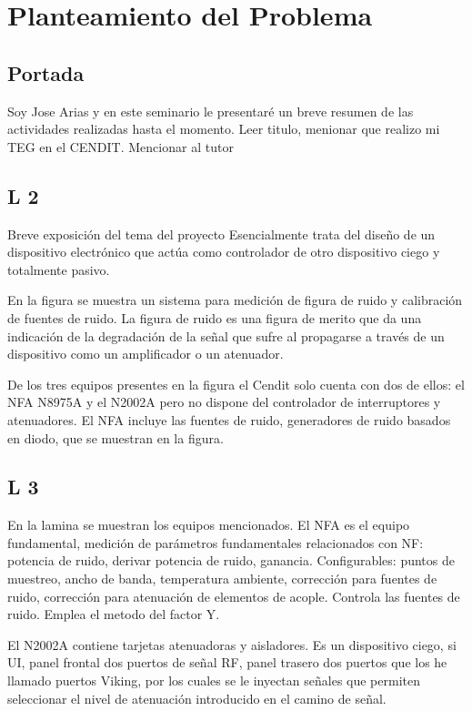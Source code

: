 \documentclass[paper=letter,oneside,fontsize=9pt]{scrartcl}
\begin{document}
	\section{Planteamiento del Problema}
	
	\subsection{Portada}
	
	Soy Jose Arias y en este seminario le presentaré un breve resumen de las actividades realizadas hasta el momento. Leer titulo, menionar que realizo mi TEG en el CENDIT. Mencionar al tutor
	
	\subsection{L 2}
	
	Breve exposición del tema del proyecto	Esencialmente trata del diseño de un dispositivo electrónico que actúa como controlador de otro dispositivo ciego y totalmente pasivo.
	
	En la figura se muestra un sistema para medición de figura de ruido y calibración de fuentes de ruido. La figura de ruido es una figura de merito que da una indicación de la degradación de la señal que sufre al propagarse a través de un dispositivo como un amplificador o un atenuador.
	
	De los tres equipos presentes en la figura el Cendit solo cuenta con dos de ellos: el NFA N8975A y el N2002A pero no dispone del controlador de interruptores y atenuadores. El NFA incluye las fuentes de ruido, generadores de ruido basados en diodo, que se muestran en la figura.
	
	\subsection{L 3}
	
	En la lamina se muestran los equipos mencionados. El NFA es el equipo fundamental, medición de parámetros fundamentales relacionados con NF: potencia de ruido, derivar potencia de ruido, ganancia. Configurables: puntos de muestreo, ancho de banda, temperatura ambiente, corrección para fuentes de ruido, corrección para atenuación de elementos de acople. Controla las fuentes de ruido. Emplea el metodo del factor Y.
	
	El N2002A  contiene tarjetas  atenuadoras y aisladores. Es un dispositivo ciego, si UI, panel frontal dos puertos de señal RF, panel trasero dos puertos que los he llamado puertos Viking, por los cuales se le inyectan señales que permiten seleccionar el nivel de atenuación introducido en el camino de señal.
	
\end{document}
